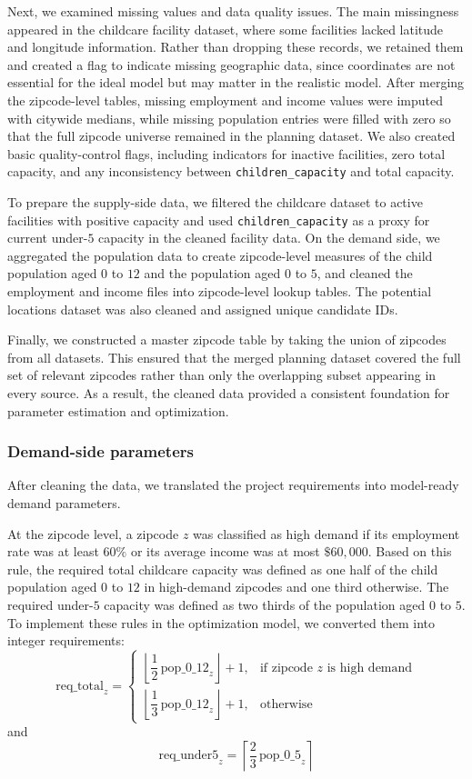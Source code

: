 \documentclass[11pt]{article}
\newcommand{\1}{\mathbb{I}}
\begin{document}
Next, we examined missing values and data quality issues. The main missingness appeared in the childcare facility dataset, where some facilities lacked latitude and longitude information. Rather than dropping these records, we retained them and created a flag to indicate missing geographic data, since coordinates are not essential for the ideal model but may matter in the realistic model. After merging the zipcode-level tables, missing employment and income values were imputed with citywide medians, while missing population entries were filled with zero so that the full zipcode universe remained in the planning dataset. We also created basic quality-control flags, including indicators for inactive facilities, zero total capacity, and any inconsistency between \texttt{children\_capacity} and total capacity.

To prepare the supply-side data, we filtered the childcare dataset to active facilities with positive capacity and used \texttt{children\_capacity} as a proxy for current under-\(5\) capacity in the cleaned facility data. On the demand side, we aggregated the population data to create zipcode-level measures of the child population aged \(0\) to \(12\) and the population aged \(0\) to \(5\), and cleaned the employment and income files into zipcode-level lookup tables. The potential locations dataset was also cleaned and assigned unique candidate IDs.

Finally, we constructed a master zipcode table by taking the union of zipcodes from all datasets. This ensured that the merged planning dataset covered the full set of relevant zipcodes rather than only the overlapping subset appearing in every source. As a result, the cleaned data provided a consistent foundation for parameter estimation and optimization.

\subsubsection{Demand-side parameters}

After cleaning the data, we translated the project requirements into model-ready demand parameters.

At the zipcode level, a zipcode \(z\) was classified as high demand if its employment rate was at least \(60\%\) or its average income was at most \(\$60{,}000\). Based on this rule, the required total childcare capacity was defined as one half of the child population aged \(0\) to \(12\) in high-demand zipcodes and one third otherwise. The required under-\(5\) capacity was defined as two thirds of the population aged \(0\) to \(5\). To implement these rules in the optimization model, we converted them into integer requirements:
\[
\mathrm{req\_total}_z =
\begin{cases}
\left\lfloor \dfrac{1}{2}\,\mathrm{pop\_0\_12}_z \right\rfloor + 1, & \text{if zipcode } z \text{ is high demand}\\[1.2ex]
\left\lfloor \dfrac{1}{3}\,\mathrm{pop\_0\_12}_z \right\rfloor + 1, & \text{otherwise}
\end{cases}
\]
and
\[
\mathrm{req\_under5}_z = \left\lceil \dfrac{2}{3}\,\mathrm{pop\_0\_5}_z \right\rceil
\]
\end{document}
